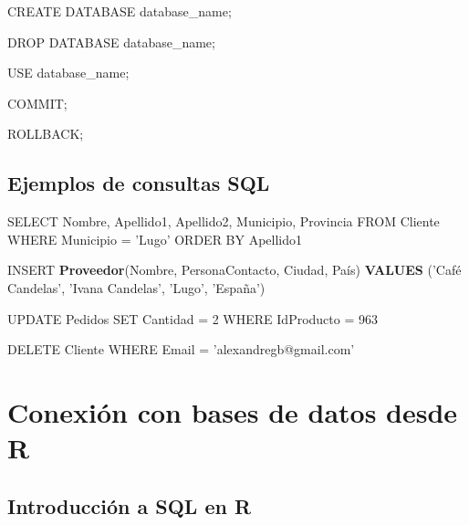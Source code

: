 \documentclass[]{book}
\newenvironment{Shaded}{\begin{snugshade}}{\end{snugshade}}
\newcommand{\DecValTok}[1]{\textcolor[rgb]{0.00,0.00,0.81}{#1}}
\newcommand{\KeywordTok}[1]{\textcolor[rgb]{0.13,0.29,0.53}{\textbf{#1}}}
\newcommand{\NormalTok}[1]{#1}
\newcommand{\StringTok}[1]{\textcolor[rgb]{0.31,0.60,0.02}{#1}}
\begin{document}
\begin{Shaded}
\begin{Highlighting}[]
\NormalTok{CREATE DATABASE database_name;}

\NormalTok{DROP DATABASE database_name;}

\NormalTok{USE database_name;}

\NormalTok{COMMIT;}

\NormalTok{ROLLBACK;}
\end{Highlighting}
\end{Shaded}

\hypertarget{ejemplos-de-consultas-sql}{%
\subsection{Ejemplos de consultas SQL}\label{ejemplos-de-consultas-sql}}

\begin{Shaded}
\begin{Highlighting}[]
\NormalTok{SELECT Nombre, Apellido1, Apellido2, Municipio, Provincia }
\NormalTok{FROM Cliente}
\NormalTok{WHERE Municipio =}\StringTok{ 'Lugo'}
\NormalTok{ORDER BY Apellido1}

\NormalTok{INSERT }\KeywordTok{Proveedor}\NormalTok{(Nombre, PersonaContacto, Ciudad, País)}
\KeywordTok{VALUES}\NormalTok{ (}\StringTok{'Café Candelas'}\NormalTok{, }\StringTok{'Ivana Candelas'}\NormalTok{, }\StringTok{'Lugo'}\NormalTok{, }\StringTok{'España'}\NormalTok{)}

\NormalTok{UPDATE Pedidos}
\NormalTok{SET Cantidad =}\StringTok{ }\DecValTok{2}
\NormalTok{WHERE IdProducto =}\StringTok{ }\DecValTok{963}

\NormalTok{DELETE Cliente}
\NormalTok{WHERE Email =}\StringTok{ 'alexandregb@gmail.com'}
\end{Highlighting}
\end{Shaded}

\hypertarget{conexion-con-bases-de-datos-desde-r}{%
\section{Conexión con bases de datos desde R}\label{conexion-con-bases-de-datos-desde-r}}

\hypertarget{introduccion-a-sql-en-r}{%
\subsection{Introducción a SQL en R}\label{introduccion-a-sql-en-r}}
\end{document}
